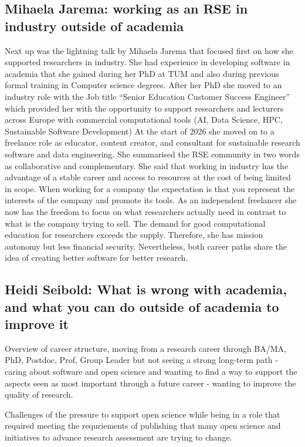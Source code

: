 \documentclass{eceasst}
\begin{document}
\subsection{Mihaela Jarema: working as an RSE in industry outside of academia}
Next up was the lightning talk by Mihaela Jarema that focused first on how she supported researchers in industry.
She had experience in developing software in academia that she gained during her PhD at TUM and also during previous formal training in
Computer science degrees.
After her PhD she moved to an industry role with the Job title ``Senior Education Customer Success Engineer''
which provided her with the opportunity to support researchers and lecturers across Europe with commercial
computational tools (AI, Data Science, HPC, Sustainable Software Development)
At the start of 2026 she moved on to a freelance role
as educator, content creator, and consultant for sustainable research software and data engineering.
She summarised the RSE community in two words as collaborative and complementary.
She said that working in industry has the advantage of a stable career and access to resources at the cost of being limited in scope.
When working for a company the expectation is that you represent the interests of the company and promote its tools.
As an independent freelancer she now has the freedom to focus on what researchers actually need in contrast to what is the company trying to sell.
The demand for good computational education for researchers exceeds the supply.
Therefore, she has mission autonomy but less financial security.
Nevertheless, both career paths share the idea of creating better software for better research.

\subsection{Heidi Seibold: What is wrong with academia, and what you can do outside of academia to improve it}

Overview of career structure, moving from a research career through BA/MA, PhD, Postdoc, Prof, Group Leader but not seeing a strong long-term path - caring about software and open science and wanting to find a way to support the aspects seen as most important through a future career - wanting to improve the quality of research.

    Challenges of the pressure to support open science while being in a role that required meeting the requriements of publishing that many open science and initiatives to advance research assessment are trying to change.
\end{document}
